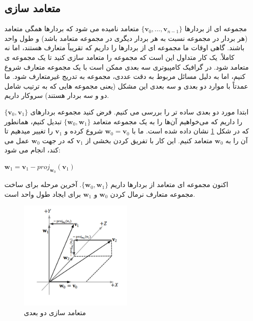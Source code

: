 \subsection{\textbf{متعامد سازی}}
\label{sec:3.1}
{
    \Large
    \begin{spacing}{1.5}
        مجموعه ای از بردارها $\{\textbf{v}_{0},...,\textbf{v}_{n-1}\}$ متعامد نامیده می شود که بردارها همگی متعامد (هر بردار در مجموعه نسبت به هر بردار دیگری در مجموعه متعامد باشد) و طول واحد باشند.
        گاهی اوقات ما مجموعه ای از بردارها را داریم که تقریباً متعارف هستند، اما نه کاملاً.
        یک کار متداول این است که مجموعه را متعامد سازی کنید تا یک مجموعه ی متعامد شود.
        در گرافیک کامپیوتری سه بعدی ممکن است با یک مجموعه متعارف شروع کنیم، اما به دلیل مسائل مربوط به دقت عددی، مجموعه به تدریج غیرمتعارف شود.
        ما عمدتاً با موارد دو بعدی و سه بعدی این مشکل (یعنی مجموعه هایی که به ترتیب شامل دو و سه بردار هستند) سروکار داریم.

        ابتدا مورد دو بعدی ساده تر را بررسی می کنیم.
        فرض کنید مجموعه بردارهای $\{\textbf{v}_{0},\textbf{v}_{1}\}$ را داریم که می‌خواهیم آن‌ها را به یک مجموعه متعامد $\{\textbf{w}_{0},\textbf{w}_{1}\}$ تبدیل کنیم،
        همانطور که در شکل \ref{fig:4.Session.1.1.11} نشان داده شده است.
        ما با $\textbf{w}_{0}=\textbf{v}_{0}$ شروع کرده و $\textbf{v}_{1}$ را تغییر میدهیم تا آن را به $\textbf{w}_{0}$ متعامد کنیم.
        این کار با تفریق کردن بخشی از $\textbf{v}_{1}$ که در جهت $\textbf{w}_{0}$  عمل می کند، انجام می شود:

        \begin{center}
            $\textbf{w}_{1}=\textbf{v}_{1}-proj_{\textbf{w}_{0}}(\textbf{v}_{1})$
        \end{center}

        اکنون مجموعه ای متعامد از بردارها داریم $\{\textbf{w}_{0},\textbf{w}_{1}\}$.
        آخرین مرحله برای ساخت مجموعه متعارف نرمال کردن $\textbf{w}_{0}$ و $\textbf{w}_{1}$ برای ایجاد طول واحد است.

        \begin{figure}[H]
            \centering
            \setlength{\belowcaptionskip}{-10pt}
            \includegraphics[width=0.5\textwidth]{Images/4/4.Session.1.1.11}
            \caption{متعامد سازی دو بعدی}
            \label{fig:4.Session.1.1.11}
        \end{figure}


\end{spacing}}
